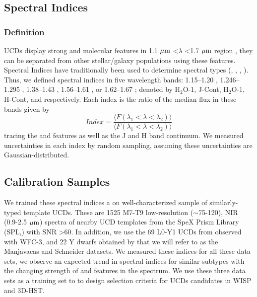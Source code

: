 \documentclass[manuscript]{aastex}
\begin{document}
\subsection{Spectral Indices}\label{indices}

\subsubsection{Definition}

UCDs display strong \meth and \wat molecular features in 1.1 $\mbox{$\mu$m}$ \textless $\lambda$ \textless 1.7 $\mbox{$\mu$m}$  region \citep{2001PhDT.......116B}, they can be separated from other stellar/galaxy populations using these features. Spectral Indices have traditionally been used to determine spectral types (\citealt{1999AJ....117.1010T}, \citealt{2000AJ....119.3019C}, \citealt{2007ApJ...657..511A}, \citealt{2007ApJ...658..557B}). Thus, we defined  spectral indices in five wavelength bands: 1.15--1.20 \micron, 1.246--1.295 \micron, 1.38--1.43 \micron,  1.56--1.61 \micron, or 1.62--1.67 \micron; denoted by H$_2$O-1, J-Cont, H$_2$O-1, H-Cont, and \meth respectively. Each index is the ratio of the median flux in these bands given by \begin{equation} Index=\frac{ \langle  F(\lambda_1<\lambda < \lambda_2) \rangle }{  \langle F(\lambda_1 < \lambda <\lambda_2) \rangle }\end{equation} tracing the \wat and \meth features as well as the J and H band continuum. We measured uncertainties in each index by random sampling, assuming these uncertainties are Gaussian-distributed.
 
\subsection{Calibration Samples}\label{trainset}

We trained these spectral indices a on well-characterized sample of similarly-typed template UCDs. These are 1525 M7-T9 low-resolution ($\sim$75-120), NIR (0.9-2.5 $\mbox{$\mu$m}$) spectra of nearby UCD templates from the SpeX Prism Library (SPL,\citealt{2014arXiv1406.4887B}) with SNR \textgreater60. In addition, we use the 69 L0-Y1 UCDs from \cite{Manjavacas2018} observed with  WFC-3, and 22 Y dwarfs obtained by \cite{Schneider2015} that we will refer to as the Manjavacas and Schneider datasets. We measured  these indices for all these data sets, we observe an expected trend in spectral indices for similar subtypes with the changing strength of \wat and \meth features in the spectrum. We use these  three data sets as a training set to to design selection criteria for UCDs candidates in WISP and 3D-HST.
\end{document}
